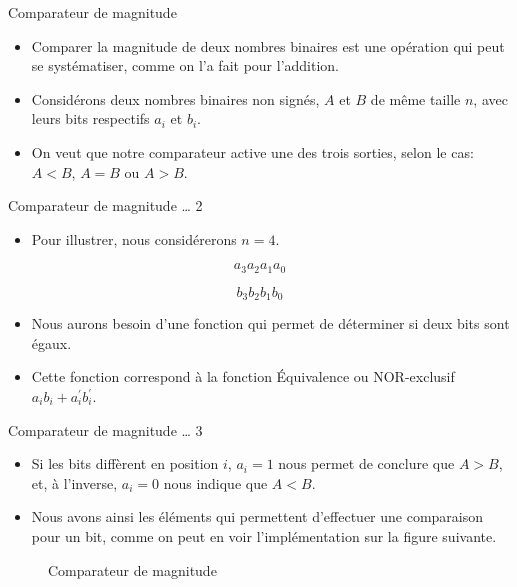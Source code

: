 \documentclass[presentation]{beamer}
\begin{document}
\begin{frame}[label={sec:orgcd7dcdf}]{Comparateur de magnitude}
\begin{itemize}
\item Comparer la magnitude de deux nombres binaires est une opération qui peut se systématiser, comme on l'a fait pour l'addition.

\item Considérons deux nombres binaires non signés, \(A\) et \(B\) de même taille \(n\), avec leurs bits respectifs \(a_i\) et \(b_i\).

\item On veut que notre comparateur active une des trois sorties, selon le cas: \(A < B\), \(A = B\) ou \(A > B\).
\end{itemize}
\end{frame}

\begin{frame}[label={sec:orgd68f5ef}]{Comparateur de magnitude \ldots{} 2}
\begin{itemize}
\item Pour illustrer, nous considérerons \(n = 4\).
\end{itemize}

$$ a_3 a_2 a_1 a_0 $$

$$ b_3 b_2 b_1 b_0 $$

\begin{itemize}
\item Nous aurons besoin d'une fonction qui permet de déterminer si deux bits sont égaux.

\item Cette fonction correspond à la fonction \alert{Équivalence} ou NOR-exclusif \(a_i b_i + a_i^\prime b_i^\prime\).
\end{itemize}
\end{frame}


\begin{frame}[label={sec:orgd89a05f}]{Comparateur de magnitude \ldots{} 3}
\begin{itemize}
\item Si les bits diffèrent en position \(i\), \(a_i = 1\) nous permet de conclure que \(A > B\), et, à l'inverse, \(a_i = 0\) nous indique que \(A < B\).

\item Nous avons ainsi les éléments qui permettent d'effectuer une comparaison pour un bit, comme on peut en voir l'implémentation sur la figure suivante.
\end{itemize}

\begin{figure}[htbp]
\centering

\caption{\label{fig:orga901ad7}Comparateur de magnitude}
\end{figure}
\end{frame}
\end{document}

